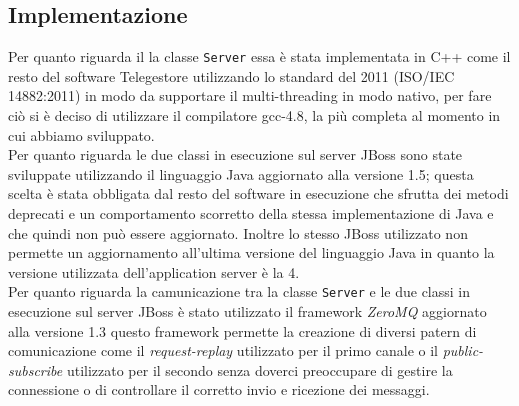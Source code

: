 \subsection{Implementazione}
Per quanto riguarda il la classe \texttt{Server} essa è stata implementata in C++ come il resto del software Telegestore utilizzando lo standard del 2011 (ISO/IEC 14882:2011\cite{c++11}) in modo da supportare il multi-threading  in modo nativo, per fare ciò si è deciso di utilizzare il compilatore gcc-4.8, la più completa al momento in cui abbiamo sviluppato.\\
Per quanto riguarda le due classi in esecuzione sul server JBoss sono state sviluppate utilizzando il linguaggio Java aggiornato alla versione 1.5; questa scelta è stata obbligata dal resto del software in esecuzione che sfrutta dei metodi deprecati e un comportamento scorretto della stessa implementazione di Java e che quindi non può essere aggiornato. Inoltre lo stesso JBoss\cite{jboss} utilizzato non permette un aggiornamento all'ultima versione del linguaggio Java in quanto la versione utilizzata dell'application server è la 4.\\
Per quanto riguarda la camunicazione tra la classe \texttt{Server} e le due classi in esecuzione sul server JBoss è stato utilizzato il framework \emph{ZeroMQ}\cite{zmq} aggiornato alla versione 1.3 questo framework permette la creazione di diversi patern di comunicazione come il \emph{request-replay} utilizzato per il primo canale o il \emph{public-subscribe} utilizzato per il secondo senza doverci preoccupare di gestire la connessione o di controllare il corretto invio e ricezione dei messaggi.
